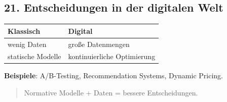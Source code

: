 \documentclass[11pt, a4paper]{article}
\begin{document}
\subsection{21. Entscheidungen in der digitalen Welt}


{\small
\begin{tabularx}{\linewidth}{XX}
\hline
\rowcolor{tableheadbg}
{\color{white}\textbf{Klassisch}} & {\color{white}\textbf{Digital}} \\[2pt]
\hline
\endhead
\hline
\endfoot
wenig Daten & große Datenmengen \\
statische Modelle & kontinuierliche Optimierung \\
\end{tabularx}
}


\textbf{Beispiele}: A/B-Testing, Recommendation Systems, Dynamic Pricing.


\begin{quote}
Normative Modelle + Daten = bessere Entscheidungen.
\end{quote}




\end{document}
